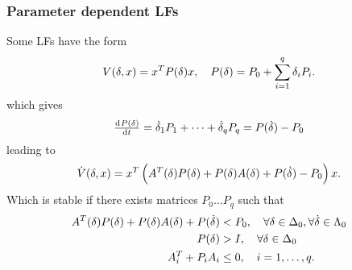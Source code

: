 \subsubsection{Parameter dependent LFs}
Some LFs have the form
%
\begin{equation}
  V(\delta,x) = x^{T} P(\delta)x,\quad P(\delta) = P_0 + \sum_{i=1}^q \delta_i P_i.
\end{equation}
%
which gives
%
\begin{equation}
  \od{P(\delta)}{t} = \dot{\delta}_1 P_1 + \dots + \dot{\delta}_q P_q = P(\dot{\delta}) - P_0
\end{equation}
%
leading to
%
\begin{equation}
  \dot{V}(\delta,x) = x^{T} \left(A^{T}(\delta) P(\delta) + P(\delta) A(\delta) + P(\dot{\delta}) - P_0 \right)x.
\end{equation}
%
Which is stable if there exists matrices $P_0 \dots P_q$ such that
%
\begin{equation}
  \begin{split}
    A^{T}(\delta)P(\delta) + P(\delta)A(\delta) + P(\dot\delta) &< P_0, \quad \forall \delta \in \Delta_0, \forall \dot\delta \in \Lambda_0 \\
    P(\delta) &> I, \quad \forall \delta \in \Delta_0 \\
    A_i^{T} + P_iA_i &\leq 0,\quad i = 1,\dots,q.
  \end{split}
\end{equation}
